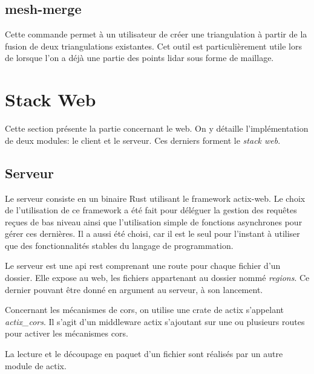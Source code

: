 \subsection{mesh-merge}

Cette commande permet à un utilisateur de créer une triangulation à
partir de la fusion de deux triangulations existantes. Cet outil est
particulièrement utile lors de lorsque l'on a déjà une partie des points lidar
sous forme de maillage.
\section{Stack Web}

Cette section présente la partie concernant le web. On y détaille l'implémentation
de deux modules: le client et le serveur.
Ces derniers forment le \textit{stack web}.

\subsection{Serveur}

Le serveur consiste en un binaire Rust utilisant le framework actix-web.
Le choix de l'utilisation de ce framework a été fait pour déléguer la gestion des
requêtes reçues de bas niveau ainsi que l'utilisation simple de fonctions
asynchrones pour gérer ces dernières.
Il a aussi été choisi, car il est le seul pour l'instant à utiliser que des fonctionnalités stables du langage de programmation.

Le serveur est une \gls{api} \gls{rest} comprenant une route pour chaque fichier
d'un dossier.
Elle expose au web, les fichiers appartenant au dossier nommé \textit{regions}.
Ce dernier pouvant être donné en argument au serveur, à son lancement.

Concernant les mécanismes de \gls{cors}, on utilise une crate de actix
s'appelant \textit{actix\_cors}.
Il s'agit d'un middleware actix s'ajoutant sur une ou plusieurs routes pour
activer les mécanismes \gls{cors}.

La lecture et le découpage en paquet d'un fichier sont réalisés par un autre
module de actix.

